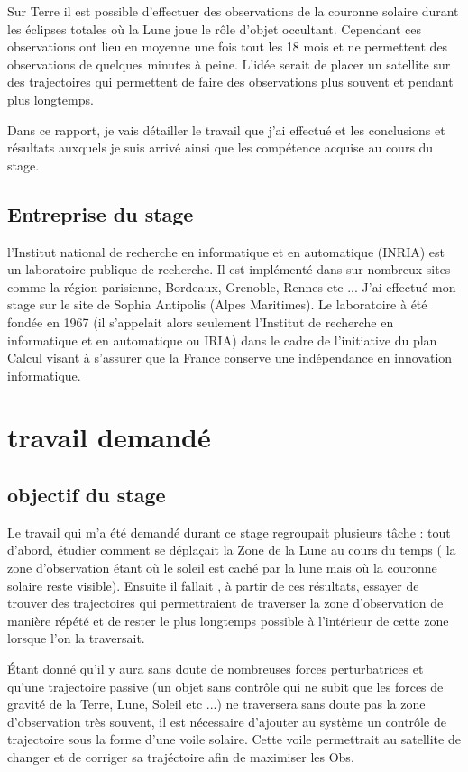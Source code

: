 \documentclass{article} %
\begin{document}
		Sur Terre il est possible d'effectuer des observations de la couronne solaire durant les éclipses totales où la Lune joue le rôle d'objet occultant. Cependant ces observations ont lieu en moyenne une fois tout les 18 mois et ne permettent des observations de quelques minutes à peine. L'idée serait de placer un satellite sur des trajectoires qui permettent de faire des observations plus souvent et pendant plus longtemps. 
		 
		Dans ce rapport, je vais détailler le travail que j'ai effectué et les conclusions et résultats auxquels je suis arrivé ainsi que les compétence acquise au cours du stage. 
		 
		\subsection{Entreprise du stage}
		
		l'Institut national de recherche en informatique et en automatique (INRIA) est un laboratoire publique de recherche. Il est implémenté dans sur nombreux sites comme la région parisienne, Bordeaux, Grenoble, Rennes etc ... J'ai effectué mon stage sur le site de Sophia Antipolis (Alpes Maritimes). Le laboratoire à été fondée en 1967 (il s'appelait alors seulement l'Institut de recherche en informatique et en automatique ou IRIA) dans le cadre de l'initiative du plan Calcul visant à s'assurer que la France conserve une indépendance en innovation informatique.
		
		
		\newpage
		\section{travail demandé}
		\subsection{objectif du stage}
		Le travail qui m'a été demandé durant ce stage regroupait plusieurs tâche : tout d'abord, étudier comment se déplaçait la \gls{Zone} de la Lune  au cours du temps ( la zone d'observation étant où le soleil est caché par la lune mais où la couronne solaire reste visible). Ensuite il fallait , à partir de ces résultats, essayer de trouver des trajectoires qui permettraient de traverser la zone d'observation de manière répété et de rester le plus longtemps possible à l'intérieur de cette zone lorsque l'on la traversait.
		
		Étant donné qu'il y aura sans doute de nombreuses forces perturbatrices et qu'une trajectoire passive (un objet sans contrôle qui ne subit que les forces de gravité de la Terre, Lune, Soleil etc ...) ne traversera sans doute pas la zone d'observation très souvent, il est nécessaire d'ajouter au système un contrôle de trajectoire sous la forme d'une voile solaire. Cette voile permettrait au satellite de changer et de corriger sa trajéctoire afin de maximiser les \gls{Obs}.
		
\end{document}
